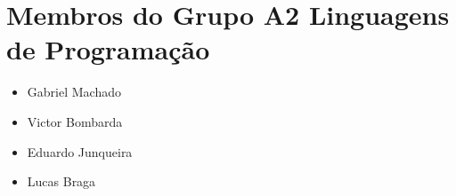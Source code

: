 \documentclass[letterpaper,10pt,brazil]{sphinxmanual}
\begin{document}
\chapter{Membros do Grupo \sphinxhyphen{} A2 \sphinxhyphen{} Linguagens de Programação}
\label{\detokenize{index:membros-do-grupo-a2-linguagens-de-programacao}}\begin{itemize}
\item {} 
Gabriel Machado

\item {} 
Victor Bombarda

\item {} 
Eduardo Junqueira

\item {} 
Lucas Braga

\end{itemize}



\renewcommand{\indexname}{Índice}
\printindex
\end{document}
